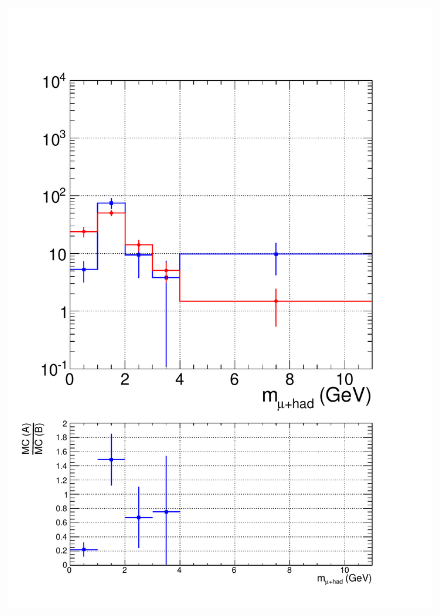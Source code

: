 \begin{figure}[hbtp]
  \begin{center}
    \includegraphics[width=\cmsFigWidth]{figures/MCClosure_lowMT_v87}

\end{center}
\end{figure}
